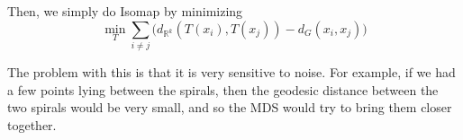   \begin{definition}[Isomap]
    \label{def:isomap}
 
    Then, we simply do Isomap by minimizing 
    \begin{equation}
      \min_{T} \sum_{i \neq j} \big( d_{\mathbb{R}^k}(T(x_i), T(x_j)) - d_G(x_i, x_j) \big)
    \end{equation}
  \end{definition}

  The problem with this is that it is very sensitive to noise. For example, if we had a few points lying between the spirals, then the geodesic distance between the two spirals would be very small, and so the MDS would try to bring them closer together.  

  \begin{figure}[H]
    \centering
\end{figure}
